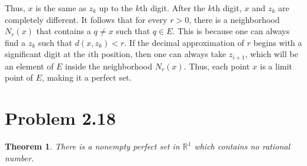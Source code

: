 \documentclass[psamsfonts]{amsart}
\newtheorem{thm}{Theorem}[section]
\theoremstyle{definition}
\theoremstyle{remark}
\numberwithin{equation}{section}
\begin{document}
Thus, $x$ is the same as $z_k$ up to the $k$th digit. After the $k$th digit, $x$ and $z_k$ are completely different. It follows that for every $r>0$, there is a neighborhood $N_r(x)$ that contains a $q \neq x$ such that $q \in E$. This is because one can always find a $z_k$ such that $d(x,z_k) < r$. If the decimal approximation of $r$ begins with a significant digit at the $i$th position, then one can always take $z_{i+1}$, which will be an element of $E$ inside the neighborhood $N_r(x)$. Thus, each point $x$ is a limit point of $E$, making it a perfect set.

\section{Problem 2.18}

\begin{thm}
There is a nonempty perfect set in $\mathbb{R}^1$ which contains no rational number.
\end{thm}
\end{document}
